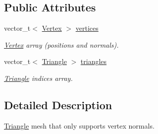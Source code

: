 \subsection*{Public Attributes}
\begin{DoxyCompactItemize}
\item 
vector\_\-t$<$ \hyperlink{structembree_1_1_triangle_mesh_with_normals_1_1_vertex}{Vertex} $>$ \hyperlink{classembree_1_1_triangle_mesh_with_normals_a25d34ce69475feabd324c012739665a1}{vertices}
\begin{DoxyCompactList}\small\item\em \hyperlink{structembree_1_1_triangle_mesh_with_normals_1_1_vertex}{Vertex} array (positions and normals). \item\end{DoxyCompactList}\item 
vector\_\-t$<$ \hyperlink{structembree_1_1_triangle_mesh_with_normals_1_1_triangle}{Triangle} $>$ \hyperlink{classembree_1_1_triangle_mesh_with_normals_ae98a0f001155d29277e327eab98f2992}{triangles}
\begin{DoxyCompactList}\small\item\em \hyperlink{structembree_1_1_triangle_mesh_with_normals_1_1_triangle}{Triangle} indices array. \item\end{DoxyCompactList}\end{DoxyCompactItemize}


\subsection{Detailed Description}
\hyperlink{structembree_1_1_triangle_mesh_with_normals_1_1_triangle}{Triangle} mesh that only supports vertex normals. 

